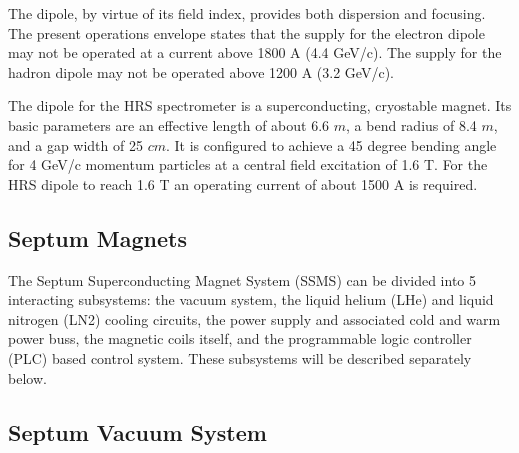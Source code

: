The dipole, by virtue of its field index, provides both
dispersion and focusing.  The present operations envelope 
states that the supply for the electron dipole may not be
operated at a current above 1800 A (4.4 GeV/c). The supply for the hadron
dipole may not be operated above 1200 A (3.2 GeV/c). 

The dipole for the HRS spectrometer is a superconducting, cryostable 
magnet.  Its basic parameters are an effective length of about 6.6 $m$, a 
bend radius of 8.4 $m$, and a gap width of 25 $cm$.  It is configured to 
achieve a 45 degree bending angle for 4 GeV/c momentum particles at a 
central field excitation of 1.6 T.  For the HRS dipole to reach 1.6 T 
an operating current of about 1500 A is required.


\subsection{\bf Septum Magnets}

The Septum Superconducting Magnet System (SSMS)
can be divided into 5 interacting subsystems: the vacuum system, the 
liquid helium (LHe) and liquid nitrogen (LN2) cooling circuits, the power supply 
and associated cold and warm power buss, the magnetic coils itself, and the 
programmable logic controller (PLC) based control system.  These subsystems 
will be described separately below.

\subsection {\bf Septum Vacuum System}

